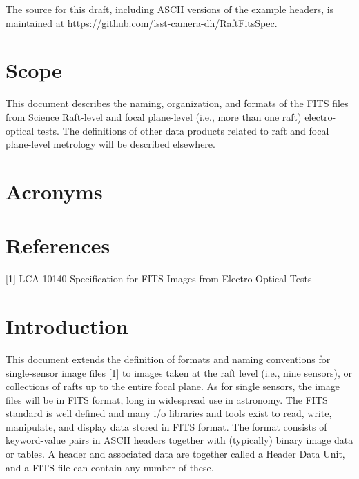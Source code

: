 \documentclass{article}[12pt]
\begin{document}
The source for this draft, including ASCII versions of the example headers, is maintained at \url{https://github.com/lsst-camera-dh/RaftFitsSpec}.

\section{Scope}
This document describes the naming, organization, and formats of the FITS files from Science Raft-level and focal plane-level (i.e., more than one raft) electro-optical tests.  The definitions of other data products related to raft and focal plane-level metrology will be described elsewhere.

\section{Acronyms}

\section{References}

[1] LCA-10140 Specification for FITS Images from Electro-Optical Tests





\section{Introduction}
This document extends the definition of formats and naming conventions for single-sensor image files [1] to images taken at the raft level (i.e., nine sensors), or collections of rafts up to the entire focal plane.  As for single sensors, the image files will be in FlTS format, long in widespread use in astronomy.  The FITS standard is well defined and many i/o libraries and tools exist to read, write, manipulate, and display data stored in FITS format.  The format consists of keyword-value pairs in ASCII headers together with (typically) binary image data or tables.  A header and associated data are together called a Header Data Unit, and a FITS file can contain any number of these.
\end{document}

